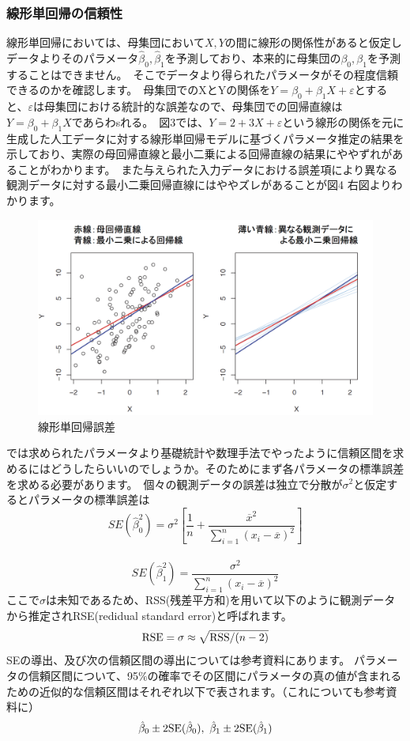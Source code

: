 \documentclass[uplatex]{jsarticle}
\begin{document}
\subsubsection{線形単回帰の信頼性}
線形単回帰においては、母集団において$X, Y$の間に線形の関係性があると仮定しデータよりそのパラメータ$\hat{\beta}_0, \hat{\beta}_1$を予測しており、本来的に母集団の$\beta_0, \beta_1$を予測することはできません。\
そこでデータより得られたパラメータがその程度信頼できるのかを確認します。\
母集団でのXとYの関係を$Y = \beta_0 + \beta_1X + \varepsilon$とすると、$\varepsilon$は母集団における統計的な誤差なので、母集団での回帰直線は$Y=\beta_0 + \beta_1X$であらわsれる。\
図3では、$Y = 2 + 3X + \varepsilon$という線形の関係を元に生成した人工データに対する線形単回帰モデルに基づくパラメータ推定の結果を示しており、実際の母回帰直線と最小二乗による回帰直線の結果にややずれがあることがわかります。\
また与えられた入力データにおける誤差項により異なる観測データに対する最小二乗回帰直線にはややズレがあることが図4 右図よりわかります。
\begin{figure}
  \begin{center}
    \includegraphics[width=13cm]{img/lienar_error.png}
    \caption{線形単回帰誤差}
  \end{center}
\end{figure}
では求められたパラメータより基礎統計や数理手法でやったように信頼区間を求めるにはどうしたらいいのでしょうか。そのためにまず各パラメータの標準誤差を求める必要があります。\
個々の観測データの誤差は独立で分散が$\sigma ^2$と仮定するとパラメータの標準誤差は
$$SE(\hat{\beta}_0^2) = \sigma^2 \left[\frac{1}{n} + \frac{\overline{x}^2}{\sum_{i=1}^n (x_i - \overline{x})^2}\right]$$\
$$SE(\hat{\beta}_1 ^2) = \frac{\sigma^2}{\sum_{i=1}^n (x_i - \overline{x})^2}$$
ここで$\sigma$は未知であるため、{\rm RSS}(残差平方和)を用いて以下のように観測データから推定されRSE(redidual standard error)と呼ばれます。
$${\rm RSE} = \sigma \approx \sqrt{{\rm RSS}/(n-2)}$$
SEの導出、及び次の信頼区間の導出については参考資料にあります。
パラメータの信頼区間について、95$\%$の確率でその区間にパラメータの真の値が含まれるための近似的な信頼区間はそれぞれ以下で表されます。（これについても参考資料に）
$$\hat{\beta}_0 \pm 2{\rm SE}(\hat{\beta}_0), \ \hat{\beta}_1 \pm 2{\rm SE}(\hat{\beta}_1)$$
\end{document}
